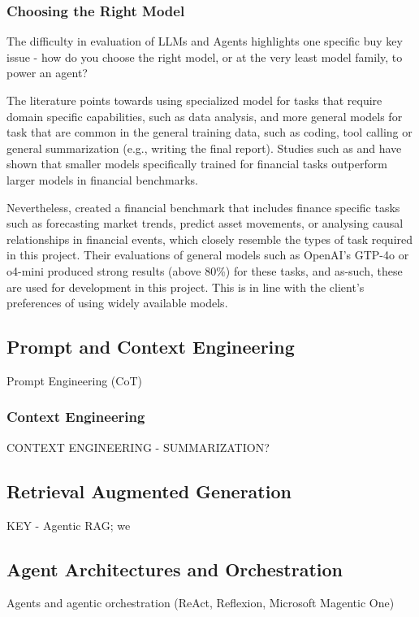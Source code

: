 \documentclass[a4paper]{report}
\begin{document}
\subsubsection{Choosing the Right Model}

The difficulty in evaluation of LLMs and Agents highlights one specific buy key issue - how do you choose the right model, or at the very least model family, to power an agent?

The literature points towards using specialized model for tasks that require domain specific capabilities, such as data analysis, and more general models for task that are common in the general training data, such as coding, tool calling or general summarization (e.g., writing the final report). Studies such as \cite{ke2025demystifyingdomainadaptiveposttrainingfinancial} and \cite{tanabe2024enhancingfinancialdomainadaptation} have shown that smaller models specifically trained for financial tasks outperform larger models in financial benchmarks.

Nevertheless, \cite{lu2025bizfinbench} created a financial benchmark that includes finance specific tasks such as forecasting market trends, predict asset movements, or analysing causal relationships in financial events, which closely resemble the types of task required in this project. Their evaluations of general models such as OpenAI's GTP-4o or o4-mini produced strong results (above 80\%) for these tasks, and as-such, these are used for development in this project. This is in line with the client's preferences of using widely available models.

\subsection{Prompt and Context Engineering}
Prompt Engineering (CoT)
\subsubsection{Context Engineering}
CONTEXT ENGINEERING - SUMMARIZATION?

\subsection{Retrieval Augmented Generation}
KEY - Agentic RAG; we

\subsection{Agent Architectures and Orchestration}
Agents and agentic orchestration (ReAct, Reflexion, Microsoft Magentic One)
\end{document}
